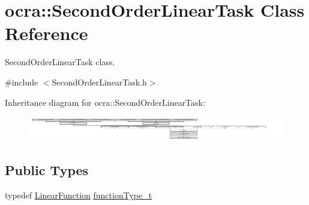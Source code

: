 \hypertarget{classocra_1_1SecondOrderLinearTask}{}\section{ocra\+:\+:Second\+Order\+Linear\+Task Class Reference}
\label{classocra_1_1SecondOrderLinearTask}


Second\+Order\+Linear\+Task class.  




{\ttfamily \#include $<$Second\+Order\+Linear\+Task.\+h$>$}

Inheritance diagram for ocra\+:\+:Second\+Order\+Linear\+Task\+:\begin{figure}[H]
\begin{center}
\leavevmode
\includegraphics[height=1.082126cm]{dd/dda/classocra_1_1SecondOrderLinearTask}
\end{center}
\end{figure}
\subsection*{Public Types}
\begin{DoxyCompactItemize}
\item 
typedef \hyperlink{classocra_1_1LinearFunction}{Linear\+Function} \hyperlink{classocra_1_1SecondOrderLinearTask_aa4843b0b2ad21ecba7decb2be86c6214}{function\+Type\+\_\+t}
\end{DoxyCompactItemize}
